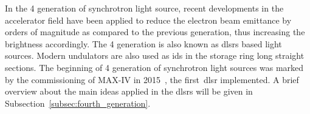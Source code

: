In the 4 generation of synchrotron light source, recent developments in the accelerator field have been applied to reduce the electron beam emittance by orders of magnitude as compared to the previous generation, thus increasing the brightness accordingly. The 4 generation is also known as \glspl{dlsr} based light sources. Modern undulators are also used as \glspl{id} in the storage ring long straight sections. The beginning of 4 generation of synchrotron light sources was marked by the commissioning of MAX-IV in 2015~\cite{eriksson2016}, the first~\gls{dlsr} implemented. A brief overview about the main ideas applied in the \glspl{dlsr} will be given in Subsection~\ref{subsec:fourth_generation}.
